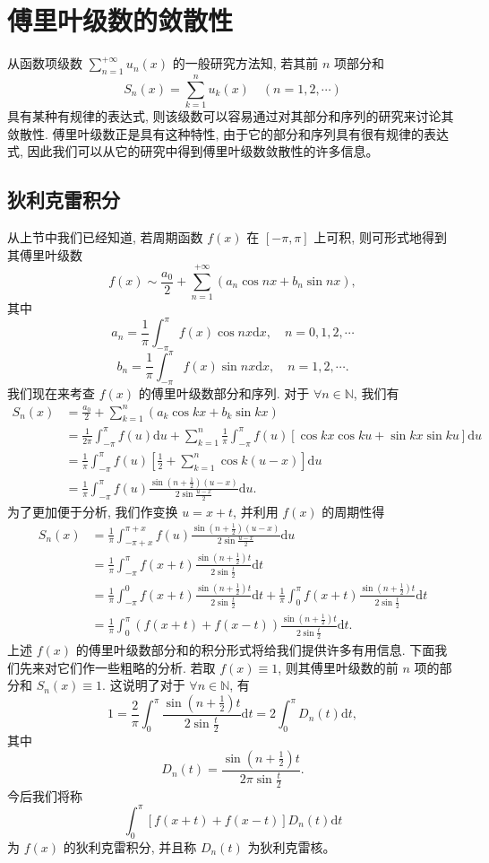 \documentclass[UTF8, 12pt, fontset=fandol, oneside]{ctexart}
\begin{document}
\section{傅里叶级数的敛散性}

从函数项级数 $\sum\limits_{n=1}^{+\infty}u_n(x)$ 的一般研究方法知, 若其前 $n$ 项部分和
\[
  S_n(x)=\sum_{k=1}^n u_k(x)\quad(n=1,2,\cdots)
\]
具有某种有规律的表达式, 则该级数可以容易通过对其部分和序列的研究来讨论其敛散性. 傅里叶级数正是具有这种特性, 由于它的部分和序列具有很有规律的表达式, 因此我们可以从它的研究中得到傅里叶级数敛散性的许多信息。

\subsection{狄利克雷积分}

从上节中我们已经知道, 若周期函数 $f(x)$ 在 $[-\pi,\pi]$ 上可积, 则可形式地得到其傅里叶级数
\[
  f(x)\sim\frac{a_0}{2}+\sum_{n=1}^{+\infty}(a_n\cos nx+b_n\sin nx),
\]
其中
\[
  a_n=\frac1\pi\int_{-\pi}^{\pi}f(x)\cos nx\mathrm dx,\quad n=0,1,2,\cdots
\]
\[
  b_n=\frac1\pi\int_{-\pi}^{\pi}f(x)\sin nx\mathrm dx,\quad n=1,2,\cdots.
\]
我们现在来考查 $f(x)$ 的傅里叶级数部分和序列. 对于 $\forall n\in\mathbb N$, 我们有
\[
\begin{aligned}
  S_n(x)
  &=\frac{a_0}{2}+\sum_{k=1}^n(a_k\cos kx+b_k\sin kx)\\
  &=\frac1{2\pi}\int_{-\pi}^{\pi}f(u)\mathrm du
    +\sum_{k=1}^n\frac1\pi\int_{-\pi}^{\pi}f(u)[\cos kx\cos ku+\sin kx\sin ku]\mathrm du\\
  &=\frac1\pi\int_{-\pi}^{\pi}f(u)\left[\frac12+\sum_{k=1}^n\cos k(u-x)\right]\mathrm du\\
  &=\frac1\pi\int_{-\pi}^{\pi}f(u)\frac{\sin\left(n+\frac12\right)(u-x)}{2\sin\frac{u-x}{2}}\mathrm du.
\end{aligned}
\]
为了更加便于分析, 我们作变换 $u=x+t$, 并利用 $f(x)$ 的周期性得
\[
\begin{aligned}
  S_n(x)
  &=\frac1\pi\int_{-\pi+x}^{\pi+x}
    f(u)\frac{\sin\left(n+\frac12\right)(u-x)}{2\sin\frac{u-x}{2}}\mathrm du\\
  &=\frac1\pi\int_{-\pi}^{\pi}
    f(x+t)\frac{\sin\left(n+\frac12\right)t}{2\sin\frac t2}\mathrm dt\\
  &=\frac1\pi\int_{-\pi}^{0}
    f(x+t)\frac{\sin\left(n+\frac12\right)t}{2\sin\frac t2}\mathrm dt
    +\frac1\pi\int_0^\pi
    f(x+t)\frac{\sin\left(n+\frac12\right)t}{2\sin\frac t2}\mathrm dt\\
  &=\frac1\pi\int_0^\pi
    (f(x+t)+f(x-t))\frac{\sin\left(n+\frac12\right)t}{2\sin\frac t2}\mathrm dt.
\end{aligned}
\]
上述 $f(x)$ 的傅里叶级数部分和的积分形式将给我们提供许多有用信息. 下面我们先来对它们作一些粗略的分析. 若取 $f(x)\equiv1$, 则其傅里叶级数的前 $n$ 项的部分和 $S_n(x)\equiv1$. 这说明了对于 $\forall n\in\mathbb N$, 有
\[
  1=\frac2\pi\int_0^\pi\frac{\sin\left(n+\frac12\right)t}{2\sin\frac t2}\mathrm dt
  =2\int_0^\pi D_n(t)\mathrm dt,
\]
其中
\[
  D_n(t)=\frac{\sin\left(n+\frac12\right)t}{2\pi\sin\frac t2}.
\]
今后我们将称
\[
  \int_0^\pi [f(x+t)+f(x-t)]D_n(t)\mathrm dt
\]
为 $f(x)$ 的狄利克雷积分, 并且称 $D_n(t)$ 为狄利克雷核。
\end{document}
